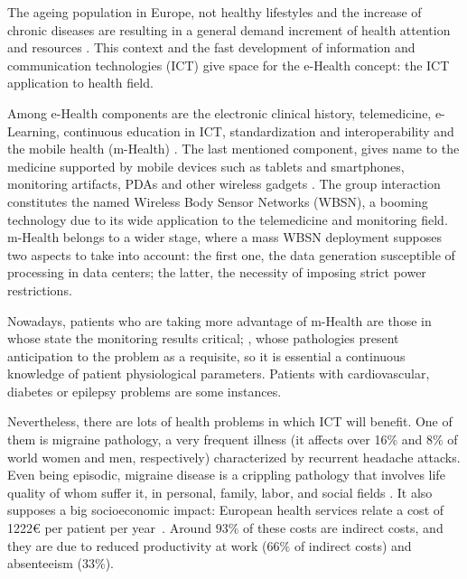 \label{chapter:introduction}

The ageing population in Europe, not healthy lifestyles and the increase of chronic diseases are resulting in a general demand increment of health attention and resources \cite{pmid18843167}. This context and the fast development of information and communication technologies (ICT) give space for the e-Health concept: the ICT application to health field.

Among e-Health components are the electronic clinical history, telemedicine, e-Learning,  continuous education in ICT, standardization and interoperability and the mobile health (m-Health) \cite{OPSOMSEstrategia}. The last mentioned component, gives name to the medicine supported by mobile devices such as tablets and smartphones, monitoring artifacts, PDAs and other wireless gadgets \cite{kay2011mhealth}. The group interaction constitutes the named Wireless Body Sensor Networks (WBSN), a booming technology due to its wide application to the telemedicine and monitoring field. m-Health belongs to a wider stage, where a mass WBSN deployment supposes two aspects to take into account: the first one, the data generation susceptible of processing in data centers; the latter, the necessity of imposing strict power restrictions.

Nowadays, patients who are taking more advantage of m-Health are those in whose state the monitoring results critical; \ie, whose pathologies present anticipation to the problem as a requisite, so it is essential a continuous knowledge of patient physiological parameters. Patients with cardiovascular, diabetes or epilepsy problems are some instances.

Nevertheless, there are lots of health problems in which ICT will benefit. One of them is migraine pathology, a very frequent illness (it affects over 16\% and 8\% of world women and men, respectively) characterized by recurrent headache attacks. Even being episodic, migraine disease is a crippling pathology that involves life quality of whom suffer it, in personal, family, labor, and social fields \cite{SENmigsinaura}. It also supposes a big socioeconomic impact: European health services relate a cost of 1222\euro{} per patient per year~\cite{Linde:2012:CostMigraineEU}. Around $93\%$ of these costs are indirect costs, and they are due to reduced productivity at work ($66\%$ of indirect costs) and absenteeism ($33\%$).

